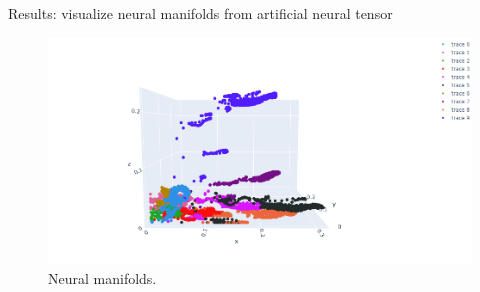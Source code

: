 \documentclass[xcolor={dvipsnames,svgnames}]{beamer}
\begin{document}
\begin{frame}{Results: visualize neural manifolds from artificial neural tensor}
    \begin{figure}[H]
        \centering
            \includegraphics[width=\textwidth]{artificial-tensor/results/TCA_3D.png}
            \caption{Neural manifolds.}
        \end{figure} 
\end{frame}
\end{document}
